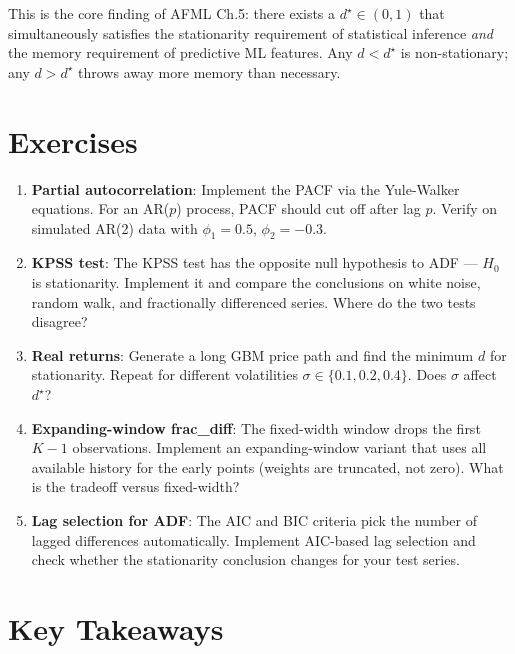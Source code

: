 \begin{keyinsight}
This is the core finding of AFML Ch.5: there exists a $d^\star \in (0, 1)$
that simultaneously satisfies the stationarity requirement of statistical
inference \emph{and} the memory requirement of predictive ML features. Any
$d < d^\star$ is non-stationary; any $d > d^\star$ throws away more memory
than necessary.
\end{keyinsight}

\section{Exercises}

\begin{enumerate}
    \item \textbf{Partial autocorrelation}: Implement the PACF via the
      Yule-Walker equations. For an AR($p$) process, PACF should cut off after
      lag $p$. Verify on simulated AR(2) data with $\phi_1 = 0.5$,
      $\phi_2 = -0.3$.

    \item \textbf{KPSS test}: The KPSS test has the opposite null hypothesis
      to ADF --- $H_0$ is stationarity. Implement it and compare the
      conclusions on white noise, random walk, and fractionally differenced
      series. Where do the two tests disagree?

    \item \textbf{Real returns}: Generate a long GBM price path and find the
      minimum $d$ for stationarity. Repeat for different volatilities
      $\sigma \in \{0.1, 0.2, 0.4\}$. Does $\sigma$ affect $d^\star$?

    \item \textbf{Expanding-window frac\_diff}: The fixed-width window drops
      the first $K - 1$ observations. Implement an expanding-window variant
      that uses all available history for the early points (weights are
      truncated, not zero). What is the tradeoff versus fixed-width?

    \item \textbf{Lag selection for ADF}: The AIC and BIC criteria pick the
      number of lagged differences automatically. Implement AIC-based lag
      selection and check whether the stationarity conclusion changes for
      your test series.
\end{enumerate}

\section{Key Takeaways}

